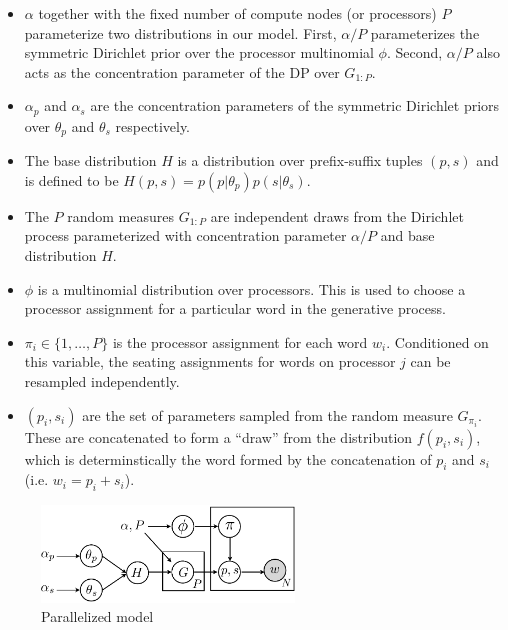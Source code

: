 \begin{itemize}

\item $\alpha$ together with the fixed number of compute nodes (or
  processors) $P$ parameterize two distributions in our model. First,
  $\alpha/P$ parameterizes the symmetric Dirichlet prior over the
  processor multinomial $\phi$. Second, $\alpha/P$ also acts as the
  concentration parameter of the DP over $G_{1:P}$.

\item $\alpha_p$ and $\alpha_s$ are the concentration parameters of
  the symmetric Dirichlet priors over $\theta_p$ and $\theta_s$
  respectively.

\item The base distribution $H$ is a distribution over prefix-suffix
  tuples $(p, s)$ and is defined to be $H(p, s) = p(p | \theta_p) p(s
  | \theta_s)$.

\item The $P$ random measures $G_{1:P}$ are independent draws from the
  Dirichlet process parameterized with concentration parameter
  $\alpha/P$ and base distribution $H$.

\item $\phi$ is a multinomial distribution over processors. This is
  used to choose a processor assignment for a particular word in the
  generative process.

\item $\pi_i \in \{1, \ldots, P\}$ is the processor assignment for
  each word $w_i$. Conditioned on this variable, the seating
  assignments for words on processor $j$ can be resampled
  independently.

\item $(p_i, s_i)$ are the set of parameters sampled from the random
  measure $G_{\pi_i}$. These are concatenated to form a ``draw'' from
  the distribution $f(p_i, s_i)$, which is determinstically the word
  formed by the concatenation of $p_i$ and $s_i$ (i.e. $w_i = p_i +
  s_i$).

\end{itemize}

\begin{figure}[h]
  \centering
  \includegraphics[width=0.6\textwidth]{fig/v3}
  \caption{Parallelized model}
  \label{fig:v3}
\end{figure}

